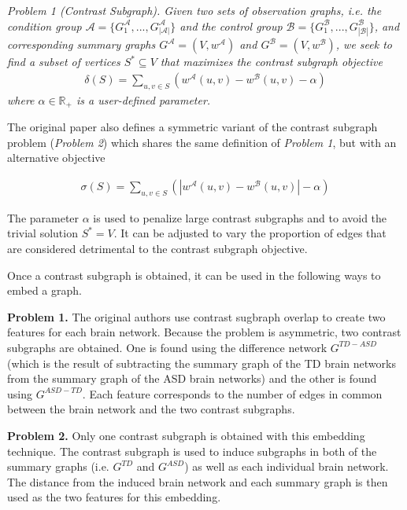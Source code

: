 \documentclass[sigconf]{acmart}
\begin{document}
\emph{Problem 1 (Contrast Subgraph). Given two sets of observation graphs, i.e. the condition group $\mathcal{A} = \{G^{\mathcal{A}}_1, . . . , G^{\mathcal{A}}_{|\mathcal{A}|}\}$ and the control group $\mathcal{B} = \{G^{\mathcal{B}}_1, . . . , G^{\mathcal{B}}_{|\mathcal{B}|}\}$, and corresponding summary graphs $G^{\mathcal{A}} = (V, w^{\mathcal{A}})$ and $G^{\mathcal{B}} = (V, w^{\mathcal{B}})$, we seek to find a subset of vertices $S^* \subseteq V$ that maximizes the contrast subgraph objective}
\begin{align*}
    \delta (S) = \sum_{u,v \in S} \left(w^{\mathcal{A}}(u,v) - w^{\mathcal{B}}(u,v) - \alpha\right)
\end{align*}
\emph{where $\alpha \in \mathbb{R}_+$ is a user-defined parameter.}

The original paper also defines a symmetric variant of the contrast subgraph problem (\emph{Problem 2}) which shares the same definition of \emph{Problem 1}, but with an alternative objective

\begin{align*}
    \sigma (S) = \sum_{u,v \in S} \left(|w^{\mathcal{A}}(u,v) - w^{\mathcal{B}}(u,v)| - \alpha\right)
\end{align*}

The parameter $\alpha$ is used to penalize large contrast subgraphs and to avoid the trivial solution $S^* = V$.
It can be adjusted to vary the proportion of edges that are considered detrimental to the contrast subgraph objective.

Once a contrast subgraph is obtained, it can be used in the following ways to embed a graph.

\textbf{Problem 1.}
The original authors use contrast sugbraph overlap to create two features for each brain network.
Because the problem is asymmetric, two contrast subgraphs are obtained.
One is found using the difference network $G^{TD - ASD}$ (which is the result of subtracting the summary graph of the TD brain networks from the summary graph of the ASD brain networks) and the other is found using $G^{ASD - TD}$.
Each feature corresponds to the number of edges in common between the brain network and the two contrast subgraphs.

\textbf{Problem 2.}
Only one contrast subgraph is obtained with this embedding technique.
The contrast subgraph is used to induce subgraphs in both of the summary graphs (i.e. $G^{TD}$ and $G^{ASD}$) as well as each individual brain network.
The distance from the induced brain network and each summary graph is then used as the two features for this embedding.
\end{document}
